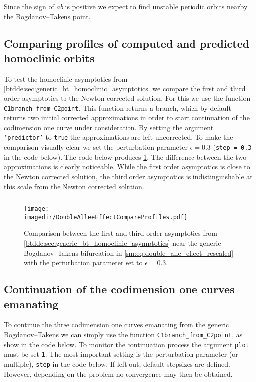 Since the sign of $ab$ is positive we expect to find unstable periodic orbits nearby the 
Bogdanov--Takens point.

\subsection{Comparing profiles of computed and predicted homoclinic orbits}
To test the homoclinic asymptotics from
\cref{btdde:sec:generic_bt_homoclinic_asymptotics} we compare the first and third
order asymptotics to the Newton corrected solution. For this we use the 
function \texttt{C1branch_from_C2point}. This function returns a branch, which
by default returns two initial corrected approximations in order to start continuation of the
codimension one curve under consideration. By setting the argument
\texttt{'predictor'} to \texttt{true} the approximations are left uncorrected.
To make the comparison visually clear we set the perturbation parameter 
$\epsilon=0.3$ (\texttt{step = 0.3} in the code below).
The code below produces \cref{sm:fig:DoubleAlleeEffectCompareProfiles}.
The difference between the two approximations is clearly noticeable. While
the first order asymptotics is close to the Newton corrected solution, the third
order asymptotics is indistinguishable at this scale from the Newton corrected
solution.
\inputminted[firstline=62, lastline=80]{MATLAB}{\pathToDDEBifToolDemos/predator_prey/predator_prey.m}
\begin{figure}[ht]
    \centering
    \texttt{[image: \\imagedir/DoubleAlleeEffectCompareProfiles.pdf]}
    \caption{Comparison between the first and third-order asymptotics from
    \cref{btdde:sec:generic_bt_homoclinic_asymptotics} near the generic
        Bogdanov--Takens bifurcation in \cref{sm:eq:double_alle_effect_rescaled} with the
        perturbation parameter set to $\epsilon=0.3$.}
    \label{sm:fig:DoubleAlleeEffectCompareProfiles}
\end{figure}

\subsection{Continuation of the codimension one curves emanating}
To continue the three codimension one curves emanating from the generic
Bogdanov--Takens we can simply use the function
\texttt{C1branch_from_C2point}, as show in the code below. To monitor the
continuation process the argument \texttt{plot} must be set \texttt{1}.
The most important setting is the perturbation parameter (or multiple),
\texttt{step} in the code below. If left out, default stepsizes are defined.
However, depending on the problem no convergence may then be obtained.
\inputminted[firstline=82, lastline=100]{MATLAB}{\pathToDDEBifToolDemos/predator_prey/predator_prey.m}


